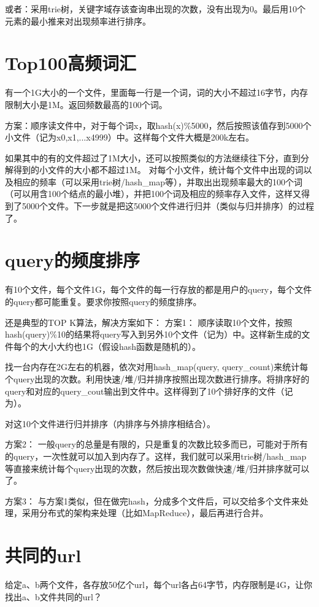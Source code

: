 或者：采用trie树，关键字域存该查询串出现的次数，没有出现为0。最后用10个元素的最小推来对出现频率进行排序。

\section{Top100高频词汇}
有一个1G大小的一个文件，里面每一行是一个词，词的大小不超过16字节，内存限制大小是1M。返回频数最高的100个词。

方案：顺序读文件中，对于每个词x，取hash(x)\%5000，然后按照该值存到5000个小文件（记为x0,x1,...x4999）中。这样每个文件大概是200k左右。

如果其中的有的文件超过了1M大小，还可以按照类似的方法继续往下分，直到分解得到的小文件的大小都不超过1M。
对每个小文件，统计每个文件中出现的词以及相应的频率（可以采用trie树/hash_map等），并取出出现频率最大的100个词（可以用含100个结点的最小堆），并把100个词及相应的频率存入文件，这样又得到了5000个文件。下一步就是把这5000个文件进行归并（类似与归并排序）的过程了。

\section{query的频度排序}
有10个文件，每个文件1G，每个文件的每一行存放的都是用户的query，每个文件的query都可能重复。要求你按照query的频度排序。

还是典型的TOP K算法，解决方案如下：
方案1：
顺序读取10个文件，按照hash(query)\%10的结果将query写入到另外10个文件（记为）中。这样新生成的文件每个的大小大约也1G（假设hash函数是随机的）。

找一台内存在2G左右的机器，依次对用hash_map(query, 
query_count)来统计每个query出现的次数。利用快速/堆/归并排序按照出现次数进行排序。将排序好的query和对应的query_cout输出到文件中。这样得到了10个排好序的文件（记为）。

对这10个文件进行归并排序（内排序与外排序相结合）。

方案2：
一般query的总量是有限的，只是重复的次数比较多而已，可能对于所有的query，一次性就可以加入到内存了。这样，我们就可以采用trie树/hash_map等直接来统计每个query出现的次数，然后按出现次数做快速/堆/归并排序就可以了。

方案3：
与方案1类似，但在做完hash，分成多个文件后，可以交给多个文件来处理，采用分布式的架构来处理（比如MapReduce），最后再进行合并。

\section{共同的url}
给定a、b两个文件，各存放50亿个url，每个url各占64字节，内存限制是4G，让你找出a、b文件共同的url？

